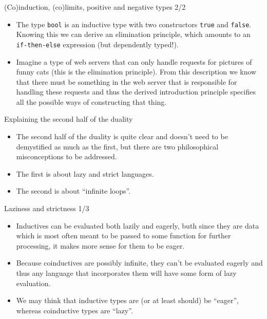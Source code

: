 \documentclass{beamer}
\begin{document}
\begin{frame}{(Co)induction, (co)limits, positive and negative types 2/2}
\begin{itemize}
	\item The type \texttt{bool} is an inductive type with two constructors \texttt{true} and \texttt{false}. Knowing this we can derive an elimination principle, which amounts to an \texttt{if-then-else} expression (but dependently typed!).
	\item Imagine a type of web servers that can only handle requests for pictures of funny cats (this is the elimination principle). From this description we know that there must be something in the web server that is responsible for handling these requests and thus the derived introduction principle specifies all the possible ways of constructing that thing.
\end{itemize}
\end{frame}

\begin{frame}{Explaining the second half of the duality}
\begin{itemize}
	\item The second half of the duality is quite clear and doesn't need to be demystified as much as the first, but there are two philosophical misconceptions to be addressed.
	\item The first is about lazy and strict languages.
	\item The second is about ``infinite loops''.
\end{itemize}
\end{frame}

\begin{frame}{Laziness and strictness 1/3}
\begin{itemize}
	\item Inductives can be evaluated both lazily and eagerly, buth since they are data which is most often meant to be passed to some function for further processing, it makes more sense for them to be eager.
	\item Because coinductives are possibly infinite, they can't be evaluated eagerly and thus any language that incorporates them will have some form of lazy evaluation.
	\item We may think that inductive types are (or at least should) be ``eager'', whereas coinductive types are ``lazy''.
\end{itemize}
\end{frame}
\end{document}
